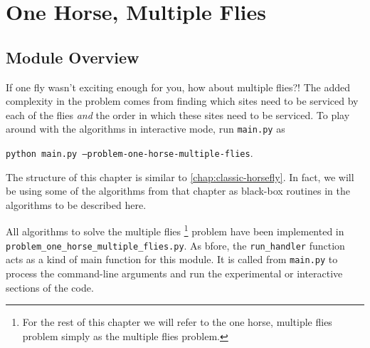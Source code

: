 \documentclass[11.5pt]{report}
\begin{document}
\chapter{One Horse, Multiple Flies}
\label{chap:one-horse-multiple-flies}

\section{Module Overview}
If one fly wasn't exciting enough for you, how about multiple flies?! The added complexity
in the problem comes from finding which sites need to be serviced by each of the flies 
\textit{and} the order in which these sites need to be serviced. To play around with the 
algorithms in interactive mode, run \texttt{main.py} as 

\begin{center}
\texttt{python main.py --problem-one-horse-multiple-flies}. 
\end{center}

The structure of this chapter is similar to \autoref{chap:classic-horsefly}. In fact, 
we will be using some of the algorithms from that chapter as black-box routines in 
the algorithms to be described here. 


All algorithms to solve the multiple flies 
\footnote{For the rest of this chapter we will refer to the one horse, 
multiple flies problem simply as the multiple flies problem.} 
problem have been implemented in \texttt{problem\_one\_horse\_multiple\_flies.py}. 
As bfore, the \verb|run_handler| function acts as a kind of main function for this module. 
It is called from \verb|main.py| to process the command-line arguments and run the 
experimental or interactive sections of the code. 
\end{document}
